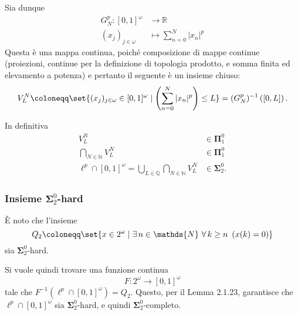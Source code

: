 \documentclass{article}
\newcommand{\1}{\mathds{1}}
\newcommand{\R}{\mathds{R}}
\newcommand{\Q}{\mathds{Q}}
\newcommand{\N}{\mathds{N}}
\begin{document}
Sia dunque
\begin{align*}
G_{N}^{p}: [0,1]^{\omega} &\longrightarrow \R\\
(x_{j})_{j \in \omega} &\longmapsto \sum_{n=0}^{N} |x_{n}|^{p}
\end{align*}
Questa è una mappa continua, poiché composizione di mappe continue (proiezioni, continue per la definizione di topologia prodotto, e somma finita ed elevamento a potenza) e pertanto il seguente è un insieme chiuso:
\begin{equation*}
V_{L}^{N} \coloneqq \set{(x_{j})_{j \in \omega} \in [0,1]^{\omega}\mid \left(\sum_{n=0}^{N} |x_{n}|^{p}\right) \le L} = (G_{N}^{p})^{-1}\left([0,L]\right).
\end{equation*}

In definitiva
\begin{align*}
V_{L}^{N} &\in \bm{\Pi}_{1}^{0}\\
\bigcap_{N \in \N} V_{L}^{N} &\in \bm{\Pi}_{1}^{0}\\
\ell^{p}\cap[0,1]^{\omega} = \bigcup_{L \in \Q}\bigcap_{N \in \N} V_{L}^{N} &\in \bm{\Sigma}_{2}^{0}.
\end{align*}
\subsubsection{Insieme \(\mathbf{\Sigma}^{0}_{2}\)-hard}
\label{sec:orgd214343}

È noto che l'insieme
\begin{equation*}
Q_{2}\coloneqq \set{x \in 2^{\omega}\mid
\exists\, n \in \N\ \forall\, k \ge n\ \left(x(k) = 0\right)
}
\end{equation*}
sia \(\bm{\Sigma}_{2}^{0}\)-hard.

Si vuole quindi trovare una funzione continua
\begin{equation*}
F: 2^{\omega} \longrightarrow [0,1]^{\omega}
\end{equation*}
tale che \(F^{-1}\left(\ell^{p}\cap[0,1]^{\omega}\right)=Q_{2}\). Questo, per il Lemma 2.1.23, garantisce che \(\ell^{p}\cap[0,1]^{\omega}\) sia \(\bm{\Sigma}_{2}^{0}\)-hard, e quindi \(\bm{\Sigma}_{2}^{0}\)-completo.
\end{document}
